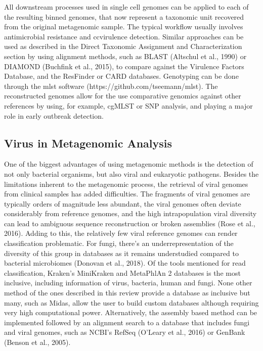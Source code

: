 All downstream processes used in single cell genomes can be applied to each of the resulting binned genomes, that now represent a taxonomic unit recovered from the original metagenomic sample. The typical workflow usually involves antimicrobial resistance and ccvirulence detection. Similar approaches can be used as described in the Direct Taxonomic Assignment and Characterization section by using alignment methods, such as BLAST (Altschul et al., 1990) or DIAMOND (Buchfink et al., 2015), to compare against the Virulence Factors Database, and the ResFinder or CARD databases. Genotyping can be done through the mlst software (https://github.com/tseemann/mlst). The reconstructed genomes allow for the use comparative genomics against other references by using, for example, cgMLST or SNP analysis, and playing a major role in early outbreak detection. 


\subsection{Virus in Metagenomic Analysis}
One of the biggest advantages of using metagenomic methods is the detection of not only bacterial organisms, but also viral and eukaryotic pathogens. 
Besides the limitations inherent to the metagenomic process, the retrieval of viral genomes from clinical samples has added difficulties. The fragments of viral genomes are typically orders of magnitude less abundant, the viral genomes often deviate considerably from reference genomes, and the high intrapopulation viral diversity can lead to ambiguous sequence reconstruction or broken assemblies (Rose et al., 2016). Adding to this, the relatively few viral reference genomes can render classification problematic. For fungi, there’s an underrepresentation of the diversity of this group in databases as it remains understudied compared to bacterial microbiomes (Donovan et al., 2018).
Of the tools mentioned for read classification, Kraken’s MiniKraken and MetaPhlAn 2 databases is the most inclusive, including information of virus, bacteria, human and fungi. None other method of the ones described in this review provide a database as inclusive but many, such as Midas, allow the user to build custom databases although requiring very high computational power. Alternatively, the assembly based method can be implemented followed by an alignment search to a database that includes fungi and viral genomes, such as NCBI’s RefSeq (O’Leary et al., 2016) or GenBank (Benson et al., 2005). 
